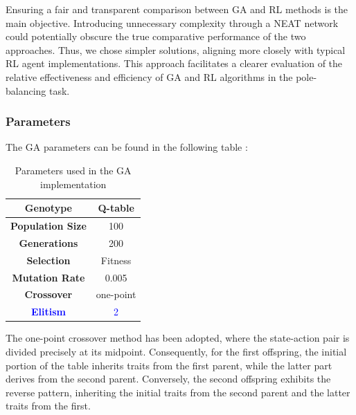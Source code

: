 Ensuring a fair and transparent comparison between GA and RL methods is the main objective. Introducing unnecessary complexity through a NEAT network could potentially obscure the true comparative performance of the two approaches. Thus, we chose simpler solutions, aligning more closely with typical RL agent implementations. This approach facilitates a clearer evaluation of the relative effectiveness and efficiency of GA and RL algorithms in the pole-balancing task.

\subsubsection{Parameters}
The GA parameters can be found in the following table :
\begin{table}[htb]%
	\centering
	\caption{Parameters used in the GA implementation}
	\label{tab:GA_parameters}
	\begin{tabular}{|S|S|} 		%
		
		\hline
		{\textbf{Genotype}} &  {Q-table} \\
		\hline
		{\textbf{Population Size}} & {100} \\
		\hline
		{\textbf{Generations}} & {200} \\
		\hline
		{\textbf{Selection}}  & {Fitness} \\
		\hline
		{\textbf{Mutation Rate}} & {0.005} \\
		\hline
		{\textbf{Crossover}}& {one-point} \\
		\hline
		{\textbf{\textcolor{blue}{Elitism}}}& {\textcolor{blue}{2} } \\
		\hline

	\end{tabular}
\end{table}

The one-point crossover method has been adopted, where the state-action pair is divided precisely at its midpoint. Consequently, for the first offspring, the initial portion of the table inherits traits from the first parent, while the latter part derives from the second parent. Conversely, the second offspring exhibits the reverse pattern, inheriting the initial traits from the second parent and the latter traits from the first.

